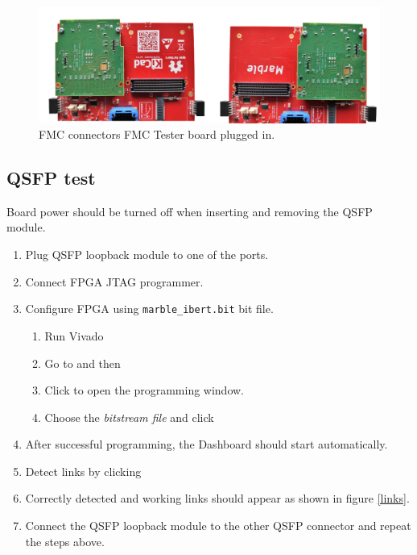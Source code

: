 \documentclass[12pt,oneside,a4]{article}
\begin{document}
\begin{figure}[H]
\begin{center}
\includegraphics[width=0.9\linewidth]{fmc_tester.png}
 \caption{FMC connectors FMC Tester board plugged in.}
\end{center}
\end{figure}

\subsection{QSFP test}

\begin{leftbar}
Board power should be turned off when inserting and removing the QSFP module.
\end{leftbar}
\begin{enumerate}
	\item Plug QSFP loopback module to one of the ports.
	\item Connect FPGA JTAG programmer.
	\item Configure FPGA using \texttt{marble\_ibert.bit} bit file.
	\begin{enumerate}
		\item Run Vivado
		\item Go to  and then  
		\item Click  to open the programming window.
		\item Choose the \textit{bitstream file} and click 
	\end{enumerate}
	\item After successful programming, the Dashboard should start automatically.
	\item Detect links by clicking 
	\item Correctly detected and working links should appear as shown in figure \ref{links}.
	\item Connect the QSFP loopback module to the other QSFP connector and repeat the steps above.
\end{enumerate}
\end{document}
